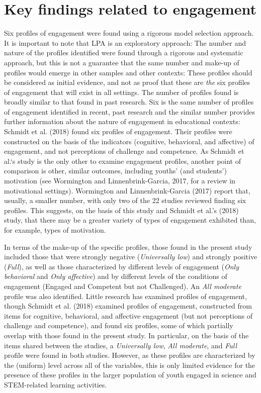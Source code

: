 \documentclass[]{msu-thesis}
\theoremstyle{definition}
\theoremstyle{definition}
\theoremstyle{definition}
\theoremstyle{remark}
\begin{document}
\section{Key findings related to
engagement}\label{key-findings-related-to-engagement}

Six profiles of engagement were found using a rigorous model selection
approach. It is important to note that LPA is an exploratory approach:
The number and nature of the profiles identified were found through a
rigorous and systematic approach, but this is not a guarantee that the
same number and make-up of profiles would emerge in other samples and
other contexts: These profiles should be considered as initial evidence,
and not as proof that these are \emph{the} six profiles of engagement
that will exist in all settings. The number of profiles found is broadly
similar to that found in past research. Six is the same number of
profiles of engagement identified in recent, past research and the
similar number provides further information about the nature of
engagement in educational contexts: Schmidt et al. (2018) found six
profiles of engagement. Their profiles were constructed on the basis of
the indicators (cognitive, behavioral, and affective) of engagement, and
not perceptions of challenge and competence. As Schmidt et al.`s study
is the only other to examine engagement profiles, another point of
comparison is other, similar outcomes, including youths' (and students')
motivation (see Wormington and Linnenbrink-Garcia, 2017, for a review in
motivational settings). Wormington and Linnenbrink-Garcia (2017) report
that, usually, a smaller number, with only two of the 22 studies
reviewed finding six profiles. This suggests, on the basis of this study
and Schmidt et al.'s (2018) study, that there may be a greater variety
of types of engagement exhibited than, for example, types of motivation.

In terms of the make-up of the specific profiles, those found in the
present study included those that were strongly negative
(\emph{Universally low}) and strongly positive (\emph{Full}), as well as
those characterized by different levels of engagement (\emph{Only
behavioral} and \emph{Only affective}) and by different levels of the
conditions of engagement (Engaged and Competent but not Challenged). An
\emph{All moderate} profile was also identified. Little research has
examined profiles of engagement, though Schmidt et al. (2018) examined
profiles of engagement, constructed from items for cognitive,
behavioral, and affective engagement (but not perceptions of challenge
and competence), and found six profiles, some of which partially overlap
with those found in the present study. In particular, on the basis of
the items shared between the studies, a \emph{Universally low},
\emph{All moderate}, and \emph{Full} profile were found in both studies.
However, as these profiles are characterized by the (uniform) level
across all of the variables, this is only limited evidence for the
presence of these profiles in the larger population of youth engaged in
science and STEM-related learning activities.
\end{document}
